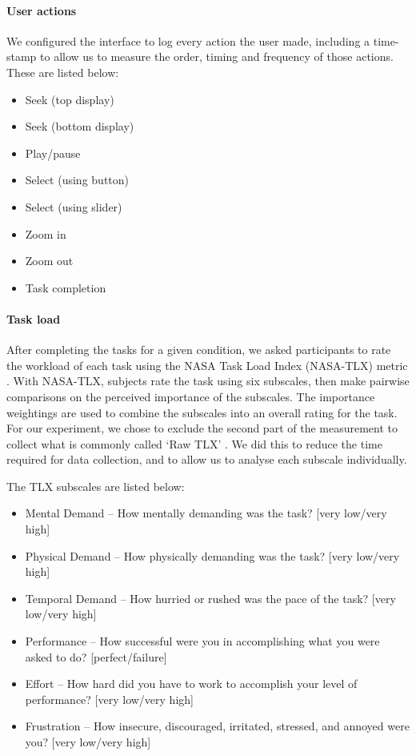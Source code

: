 \paragraph{User actions}
We configured the interface to log every action the user made, including a time-stamp to allow us to measure the order,
timing and frequency of those actions. These are listed below:

{\singlespacing
\begin{itemize}
  \item Seek (top display)
  \item Seek (bottom display)
  \item Play/pause
  \item Select (using button)
  \item Select (using slider)
  \item Zoom in
  \item Zoom out
  \item Task completion
\end{itemize}
}

\paragraph{Task load}
After completing the tasks for a given condition, we asked participants to rate the workload of each task using the
NASA Task Load Index (NASA-TLX) metric \citep{Hart1988}.  With NASA-TLX, subjects rate the task using six subscales,
then make pairwise comparisons on the perceived importance of the subscales. The importance weightings are used to
combine the subscales into an overall rating for the task. For our experiment, we chose to exclude the second part of
the measurement to collect what is commonly called `Raw TLX' \citep{Hart2006}. We did this to reduce the time required
for data collection, and to allow us to analyse each subscale individually.

The TLX subscales are listed below:

{\singlespacing
\begin{itemize}
  \item Mental Demand -- How mentally demanding was the task? [very low/very high]
  \item Physical Demand -- How physically demanding was the task? [very low/very high]
  \item Temporal Demand -- How hurried or rushed was the pace of the task?  [very low/very high]
  \item Performance -- How successful were you in accomplishing what you were asked to do? [perfect/failure]
  \item Effort -- How hard did you have to work to accomplish your level of performance? [very low/very high]
  \item Frustration -- How insecure, discouraged, irritated, stressed, and annoyed were you? [very low/very high]
\end{itemize}
}

